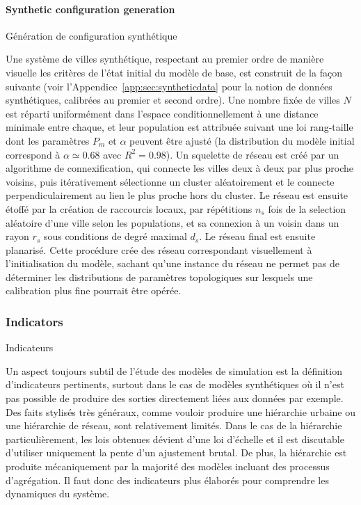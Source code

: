 \paragraph{Synthetic configuration generation}{Génération de configuration synthétique}

Une système de villes synthétique, respectant au premier ordre de manière visuelle les critères de l'état initial du modèle de base, est construit de la façon suivante (voir l'Appendice~\ref{app:sec:syntheticdata} pour la notion de données synthétiques, calibrées au premier et second ordre). Une nombre fixée de villes $N$ est réparti uniformément dans l'espace conditionnellement à une distance minimale entre chaque, et leur population est attribuée suivant une loi rang-taille dont les paramètres $P_{m}$ et $\alpha$ peuvent être ajusté (la distribution du modèle initial correspond à $\alpha\simeq 0.68$ avec $R^2=0.98$). Un squelette de réseau est créé par un algorithme de connexification, qui connecte les villes deux à deux par plus proche voisins, puis itérativement sélectionne un cluster aléatoirement et le connecte perpendiculairement au lien le plus proche hors du cluster. Le réseau est ensuite étoffé par la création de raccourcis locaux, par répétitions $n_s$ fois de la selection aléatoire d'une ville selon les populations, et sa connexion à un voisin dans un rayon $r_s$ sous conditions de degré maximal $d_s$. Le réseau final est ensuite planarisé. Cette procédure crée des réseau correspondant visuellement à l'initialisation du modèle, sachant qu'une instance du réseau ne permet pas de déterminer les distributions de paramètres topologiques sur lesquels une calibration plus fine pourrait être opérée.







\subsubsection{Indicators}{Indicateurs}

Un aspect toujours subtil de l'étude des modèles de simulation est la définition d'indicateurs pertinents, surtout dans le cas de modèles synthétiques où il n'est pas possible de produire des sorties directement liées aux données par exemple. Des faits stylisés très généraux, comme vouloir produire une hiérarchie urbaine ou une hiérarchie de réseau, sont relativement limités. Dans le cas de la hiérarchie particulièrement, les lois obtenues dévient d'une loi d'échelle et il est discutable d'utiliser uniquement la pente d'un ajustement brutal. De plus, la hiérarchie est produite mécaniquement par la majorité des modèles incluant des processus d'agrégation. Il faut donc des indicateurs plus élaborés pour comprendre les dynamiques du système.



